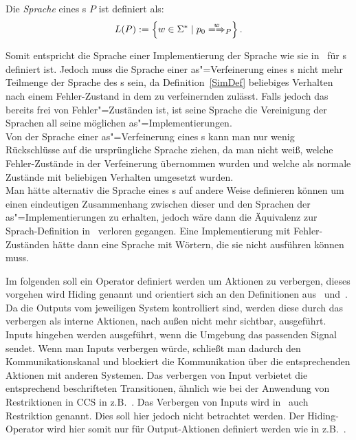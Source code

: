 \vspace{0.2cm}

\begin{Def}[Sprache]
  \label{LDef}
  Die \emph{Sprache} eines \MEIO{}s $P$ ist definiert als:
  \[L(P) := \left\{w\in \Sigma ^* \mid p_0\weakmay[w]_P \right\}.\]
\end{Def}

Somit entspricht die Sprache einer Implementierung der Sprache wie sie
in~\cite{Schinko2016BA} für \EIO{}s definiert ist. Jedoch muss die Sprache
einer as"=Verfeinerung eines \MEIO{}s nicht mehr Teilmenge der Sprache des
\MEIO{}s sein, da Definition~\ref{SimDef} beliebiges Verhalten nach einem
Fehler-Zustand in dem zu verfeinernden \MEIO{} zulässt. Falls jedoch das
\MEIO{} bereits frei von Fehler"=Zuständen ist, ist seine Sprache die
Vereinigung der Sprachen all seine möglichen as"=Implementierungen.\\
Von der Sprache einer as"=Verfeinerung eines \MEIO{}s kann man nur wenig
Rückschlüsse auf die ursprüngliche Sprache ziehen, da man nicht weiß,
welche Fehler-Zustände in der Verfeinerung übernommen wurden und welche als
normale Zustände mit beliebigen Verhalten umgesetzt wurden.\\
Man hätte alternativ die Sprache eines \MEIO{}s auf andere Weise definieren
können um einen eindeutigen Zusammenhang zwischen dieser und den Sprachen der
as"=Implementierungen zu erhalten, jedoch wäre dann die Äquivalenz zur \EIO{}
Sprach-Definition in~\cite{Schinko2016BA} verloren gegangen. Eine
Implementierung mit Fehler-Zuständen hätte dann eine Sprache mit Wörtern, die
sie nicht ausführen können muss.

Im folgenden soll ein Operator definiert werden um Aktionen zu verbergen,
dieses vorgehen wird Hiding genannt und orientiert sich an den Definitionen
aus~\cite{Vogler2016MIA3} und~\cite{Schinko2016BA}. Da die Outputs vom
jeweiligen System kontrolliert sind, werden diese durch das verbergen als
interne Aktionen, nach außen nicht mehr sichtbar, ausgeführt. Inputs hingeben
werden ausgeführt, wenn die Umgebung das passenden Signal sendet. Wenn man
Inputs verbergen würde, schließt man dadurch den Kommunikationskanal und
blockiert die Kommunikation über die entsprechenden Aktionen mit anderen
Systemen. Das verbergen von Input verbietet die entsprechend beschrifteten
Transitionen, ähnlich wie bei der Anwendung von Restriktionen in CCS in
z.B.~\cite{Milner1989}. Das Verbergen von Inputs wird in~\cite{Vogler2016MIA3}
auch Restriktion genannt. Dies soll hier jedoch nicht betrachtet werden. Der
Hiding-Operator wird hier somit nur für Output-Aktionen definiert werden wie in
z.B.~\cite{Schinko2016BA}.


